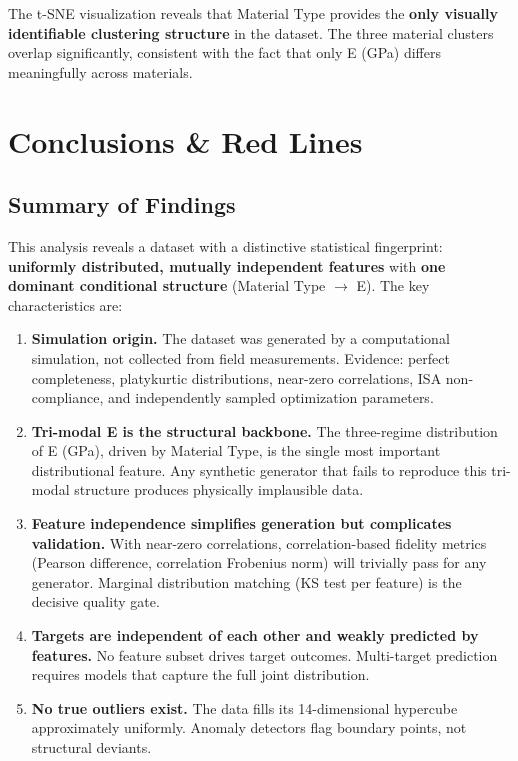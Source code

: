 \documentclass[11pt, a4paper]{report}
\begin{document}
The t-SNE visualization reveals that Material Type provides the \textbf{only visually identifiable clustering structure} in the dataset. The three material clusters overlap significantly, consistent with the fact that only E (GPa) differs meaningfully across materials.


\chapter{Conclusions \& Red Lines}

\section{Summary of Findings}

This analysis reveals a dataset with a distinctive statistical fingerprint: \textbf{uniformly distributed, mutually independent features} with \textbf{one dominant conditional structure} (Material Type $\rightarrow$ E). The key characteristics are:

\begin{enumerate}[leftmargin=*, itemsep=6pt]
\item \textbf{Simulation origin.} The dataset was generated by a computational simulation, not collected from field measurements. Evidence: perfect completeness, platykurtic distributions, near-zero correlations, ISA non-compliance, and independently sampled optimization parameters.

\item \textbf{Tri-modal E is the structural backbone.} The three-regime distribution of E (GPa), driven by Material Type, is the single most important distributional feature. Any synthetic generator that fails to reproduce this tri-modal structure produces physically implausible data.

\item \textbf{Feature independence simplifies generation but complicates validation.} With near-zero correlations, correlation-based fidelity metrics (Pearson difference, correlation Frobenius norm) will trivially pass for any generator. Marginal distribution matching (KS test per feature) is the decisive quality gate.

\item \textbf{Targets are independent of each other and weakly predicted by features.} No feature subset drives target outcomes. Multi-target prediction requires models that capture the full joint distribution.

\item \textbf{No true outliers exist.} The data fills its 14-dimensional hypercube approximately uniformly. Anomaly detectors flag boundary points, not structural deviants.
\end{enumerate}
\end{document}
